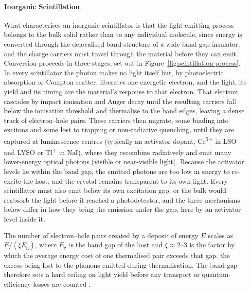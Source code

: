 \paragraph{Inorganic Scintillation}
What characterises an inorganic scintillator is that the light-emitting process belongs to the bulk solid rather than to any individual molecule, since energy is converted through the delocalised band structure of a wide-band-gap insulator, and the charge carriers must travel through the material before they can emit.
Conversion proceeds in three stages, set out in Figure~\ref{fig:scintillation-process}.
In every scintillator the  photon makes no light itself but, by photoelectric absorption or Compton scatter, liberates one energetic electron, and the light, its yield and its timing are the material's response to that electron.
That electron cascades by impact ionisation and Auger decay until the resulting carriers fall below the ionisation threshold and thermalise to the band edges, leaving a dense track of electron--hole pairs.
These carriers then migrate, some binding into excitons and some lost to trapping or non-radiative quenching, until they are captured at luminescence centres (typically an activator dopant, Ce\textsuperscript{3+} in LSO and LYSO or Tl\textsuperscript{+} in NaI), where they recombine radiatively and emit many lower-energy optical photons (visible or near-visible light).
Because the activator levels lie within the band gap, the emitted photons are too low in energy to re-excite the host, and the crystal remains transparent to its own light.
Every scintillator must also emit below its own excitation gap, or the bulk would reabsorb the light before it reached a photodetector, and the three mechanisms below differ in how they bring the emission under the gap, here by an activator level inside it.

The number of electron--hole pairs created by a deposit of energy $E$ scales as $E/(\xi E_\mathrm{g})$, where $E_\mathrm{g}$ is the band gap of the host and $\xi \approx 2$--$3$ is the factor by which the average energy cost of one thermalised pair exceeds that gap, the excess being lost to the phonons emitted during thermalisation.
The band gap therefore sets a hard ceiling on light yield before any transport or quantum-efficiency losses are counted \cite{Lempicki1993}.

